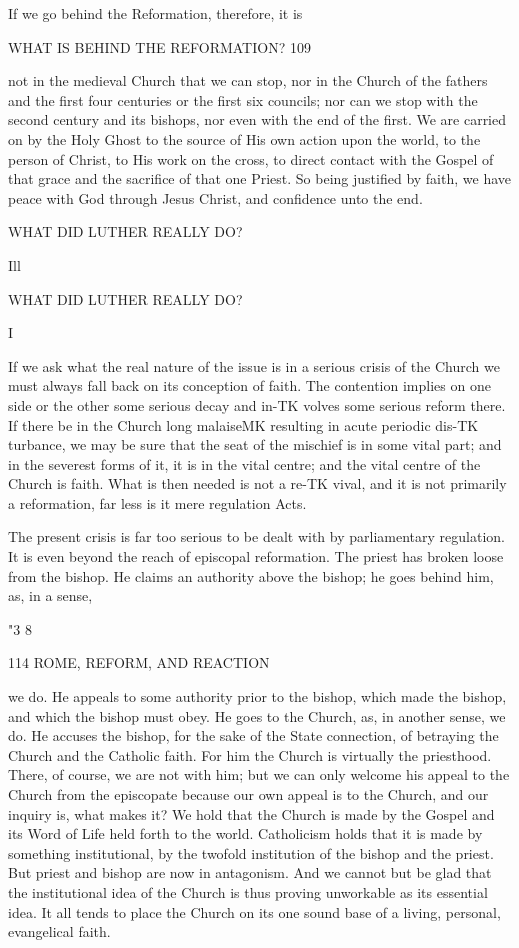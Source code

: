 \documentclass[12pt,a5paper,twoside]{book}
\begin{document}
If we go behind the Reformation, therefore, it is 



WHAT IS BEHIND THE REFORMATION? 109 

not in the medieval Church that we can stop, nor in 
the Church of the fathers and the first four centuries 
or the first six councils; nor can we stop with the 
second century and its bishops, nor even with the end 
of the first. We are carried on by the Holy Ghost 
to the source of His own action upon the world, to 
the person of Christ, to His work on the cross, to 
direct contact with the Gospel of that grace and the 
sacrifice of that one Priest. So being justified by faith, 
we have peace with God through Jesus Christ, and 
confidence unto the end. 



WHAT DID LUTHER REALLY DO? 



Ill 

WHAT DID LUTHER REALLY DO? 

I 

If we ask what the real nature of the issue is in a 
serious crisis of the Church we must always fall back 
on its conception of faith. The contention implies 
on one side or the other some serious decay and in-TK
volves some serious reform there. If there be in the 
Church long malaiseMK resulting in acute periodic dis-TK
turbance, we may be sure that the seat of the mischief 
is in some vital part; and in the severest forms of it, 
it is in the vital centre; and the vital centre of the 
Church is faith. What is then needed is not a re-TK
vival, and it is not primarily a reformation, far less 
is it mere regulation Acts. 

The present crisis is far too serious to be dealt with 
by parliamentary regulation. It is even beyond the 
reach of episcopal reformation. The priest has 
broken loose from the bishop. He claims an authority 
above the bishop; he goes behind him, as, in a sense, 

"3 8 



114 ROME, REFORM, AND REACTION 

we do. He appeals to some authority prior to the 
bishop, which made the bishop, and which the bishop 
must obey. He goes to the Church, as, in another 
sense, we do. He accuses the bishop, for the sake of 
the State connection, of betraying the Church and the 
Catholic faith. For him the Church is virtually the 
priesthood. There, of course, we are not with him; 
but we can only welcome his appeal to the Church 
from the episcopate because our own appeal is to the 
Church, and our inquiry is, what makes it? We 
hold that the Church is made by the Gospel and its 
Word of Life held forth to the world. Catholicism 
holds that it is made by something institutional, by the 
twofold institution of the bishop and the priest. But 
priest and bishop are now in antagonism. And we 
cannot but be glad that the institutional idea of the 
Church is thus proving unworkable as its essential 
idea. It all tends to place the Church on its one 
sound base of a living, personal, evangelical faith. 
\end{document}
